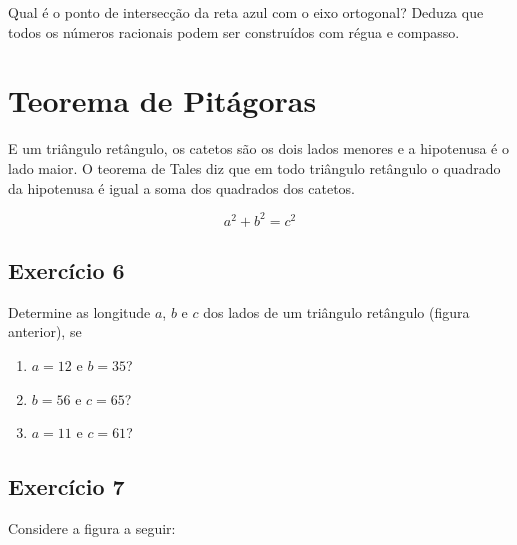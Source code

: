 Qual é o ponto de intersecção da reta azul com o eixo ortogonal? Deduza que
todos os números racionais podem ser construídos com régua e compasso.

\section{Teorema de Pitágoras}

E um triângulo retângulo, os catetos são os dois lados menores e a hipotenusa é
o lado maior. O teorema de Tales diz que em todo triângulo retângulo o quadrado
da hipotenusa é igual a soma dos quadrados dos catetos.

\begin{center}
\end{center}

$$
a^2 + b^2 = c^2
$$

\subsection*{Exercício 6}

Determine as longitude $a$, $b$ e $c$ dos lados de um triângulo retângulo
(figura anterior), se

\begin{enumerate}
\item $a = 12$ e $b = 35$?
\item $b = 56$ e $c = 65$?
\item $a = 11$ e $c = 61$?
\end{enumerate}

\subsection*{Exercício 7}

Considere a figura a seguir:

